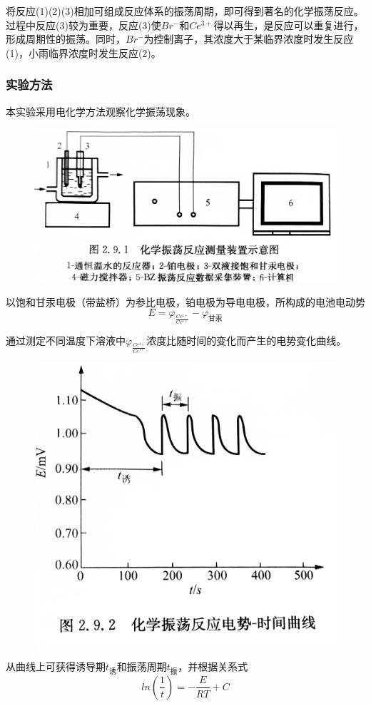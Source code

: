 \documentclass[12pt,hyperref,a4paper,UTF8]{ctexart}
\begin{document}
将反应(1)(2)(3)相加可组成反应体系的振荡周期，即可得到著名的化学振荡反应。过程中反应(3)较为重要，反应(3)使$Br^{-}$和$Ce^{3+}$得以再生，是反应可以重复进行，形成周期性的振荡。同时，$Br^{-}$为控制离子，其浓度大于某临界浓度时发生反应(1)，小雨临界浓度时发生反应(2)。

\subsubsection{实验方法}
本实验采用电化学方法观察化学振荡现象。
\begin{figure}[htp]
    \centering
    \includegraphics[width=0.6\linewidth]{1.jpg}
    \label{fig:enter-label1}
\end{figure}

以饱和甘汞电极（带盐桥）为参比电极，铂电极为导电电极，所构成的电池电动势
\begin{equation}
    E = \varphi _{\frac{Ce^{4+}}{Ce^{3+}}} - \varphi _{\text{甘汞}}
\end{equation}


通过测定不同温度下溶液中$\varphi _{\frac{Ce^{4+}}{Ce^{3+}}}$浓度比随时间的变化而产生的电势变化曲线。
\begin{figure}[htp]
    \centering
    \includegraphics[width=0.6\linewidth]{2.jpg}
    \label{fig:enter-label}
\end{figure}

从曲线上可获得诱导期$t_{\text{诱}}$和振荡周期$t_{\text{振}}$，并根据关系式
\begin{equation}
    ln(\frac{1}{t}) = -\frac{E}{RT} + C
\end{equation}
\end{document}
